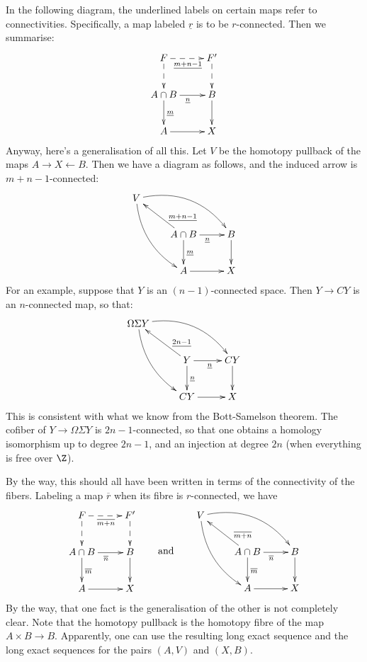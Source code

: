 \documentclass[11pt]{article}
\begin{document}
In the following diagram, the underlined labels on certain maps refer to
connectivities. Specifically, a map labeled $\underline r$ is to be
$r$-connected. Then we summarise:
\[\xymatrix{
F\ar@{-->}[r]_{\underline{m+n-1}}\ar@{-->}[d]&F'\ar@{-->}[d]\\
A\cap B\ar[d]^{\underline{m}}\ar[r]_{\underline{{n}}}&B\ar[d]\\
A\ar[r]&X
}\]
Anyway, here's a generalisation of all this. Let $V$ be the homotopy pullback of
the maps $A\rightarrow X\leftarrow B$. Then we have a diagram as follows, and
the induced arrow is $m+n-1$-connected:
\[\xymatrix{
V\ar@/_1pc/[ddr]\ar@/^1.5pc/[rrd]\\
&A\cap B\ar[ul]_(.3){\underline{m+n-1}}\ar[d]^{\underline{m}}
\ar[r]_{\underline{{n}}}&B\ar[d]\\
&A\ar[r]&X
}\]
For an example, suppose that $Y$ is an $(n-1)$-connected space. Then $Y\to CY$
is an $n$-connected map, so that:
\[\xymatrix{
\Omega\Sigma Y\ar@/_1pc/[ddr]\ar@/^1.5pc/[rrd]\\
&Y\ar[ul]_(.3){\underline{2n-1}}\ar[d]^{\underline{n}}
\ar[r]_{\underline{{n}}}&CY\ar[d]\\
&CY\ar[r]&X
}\]
This is consistent with what we know from the Bott-Samelson theorem. The cofiber
of $Y\to \Omega\Sigma Y$ is $2n-1$-connected, so that one obtains a homology
isomorphism up to degree $2n-1$, and an injection at degree $2n$ (when
everything is free over $\Z$).

By the way, this should all have been written in terms of the connectivity of
the fibers. Labeling a map $\overline r$ when its fibre is $r$-connected, we
have
\[
\xymatrix{
F\ar@{-->}[r]_{\overline{m+n}}\ar@{-->}[d]&F'\ar@{-->}[d]\\
A\cap B\ar[d]^{\overline{m}}\ar[r]_{\overline{{n}}}&B\ar[d]\\
A\ar[r]&X
}\raisebox{-1.26cm}{\qquad and\qquad }\xymatrix{
V\ar@/_1pc/[ddr]\ar@/^1.5pc/[rrd]\\
&A\cap B\ar[ul]_(.3){\overline{m+n}}\ar[d]^{\overline{m}}
\ar[r]_{\overline{{n}}}&B\ar[d]\\
&A\ar[r]&X
}\]
By the way, that one fact is the generalisation of the other is not completely
clear. Note that the homotopy pullback is the homotopy fibre of the map $A\times
B\to B$. Apparently, one can use the resulting long exact sequence and the long
exact sequences for the pairs $(A,V)$ and $(X,B)$.
\end{document}
